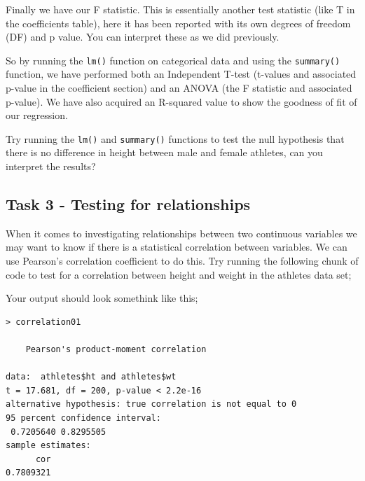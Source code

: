 \documentclass[
]{book}
\newenvironment{Shaded}{\begin{snugshade}}{\end{snugshade}}
\newcommand{\AttributeTok}[1]{\textcolor[rgb]{0.77,0.63,0.00}{#1}}
\newcommand{\CommentTok}[1]{\textcolor[rgb]{0.56,0.35,0.01}{\textit{#1}}}
\newcommand{\FunctionTok}[1]{\textcolor[rgb]{0.00,0.00,0.00}{#1}}
\newcommand{\NormalTok}[1]{#1}
\newcommand{\OtherTok}[1]{\textcolor[rgb]{0.56,0.35,0.01}{#1}}
\newcommand{\SpecialCharTok}[1]{\textcolor[rgb]{0.00,0.00,0.00}{#1}}
\newcommand{\StringTok}[1]{\textcolor[rgb]{0.31,0.60,0.02}{#1}}
\begin{document}
Finally we have our F statistic. This is essentially another test statistic (like T in the coefficients table), here it has been reported with its own degrees of freedom (DF) and p value. You can interpret these as we did previously.

So by running the \texttt{lm()} function on categorical data and using the \texttt{summary()} function, we have performed both an Independent T-test (t-values and associated p-value in the coefficient section) and an ANOVA (the F statistic and associated p-value). We have also acquired an R-squared value to show the goodness of fit of our regression.

Try running the \texttt{lm()} and \texttt{summary()} functions to test the null hypothesis that there is no difference in height between male and female athletes, can you interpret the results?

\hypertarget{task-3---testing-for-relationships}{%
\subsection{Task 3 - Testing for relationships}\label{task-3---testing-for-relationships}}

When it comes to investigating relationships between two continuous variables we may want to know if there is a statistical correlation between variables. We can use Pearson's correlation coefficient to do this. Try running the following chunk of code to test for a correlation between height and weight in the athletes data set;

\begin{Shaded}
\end{Shaded}

Your output should look somethink like this;

\begin{verbatim}
> correlation01

    Pearson's product-moment correlation

data:  athletes$ht and athletes$wt
t = 17.681, df = 200, p-value < 2.2e-16
alternative hypothesis: true correlation is not equal to 0
95 percent confidence interval:
 0.7205640 0.8295505
sample estimates:
      cor 
0.7809321 
\end{verbatim}
\end{document}
